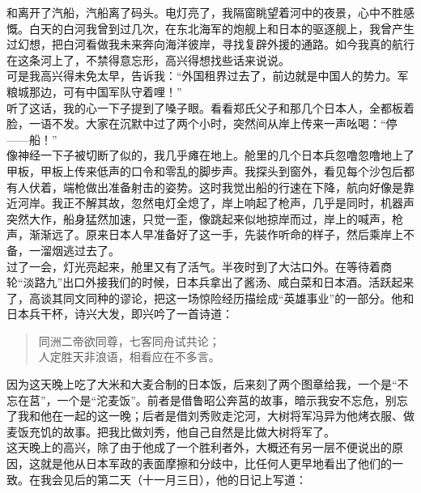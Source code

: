 和离开了汽船，汽船离了码头。电灯亮了，我隔窗眺望着河中的夜景，心中不胜感慨。白天的白河我曾到过几次，在东北海军的炮舰上和日本的驱逐舰上，我曾产生过幻想，把白河看做我未来奔向海洋彼岸，寻找复辟外援的通路。如今我真的航行在这条河上了，不禁得意忘形，高兴得想找些话来说说。\\

可是我高兴得未免太早，告诉我：“外国租界过去了，前边就是中国人的势力。军粮城那边，可有中国军队守着哩！”\\

听了这话，我的心一下子提到了嗓子眼。看看郑氏父子和那几个日本人，全都板着脸，一语不发。大家在沉默中过了两个小时，突然间从岸上传来一声吆喝：“停——船！”\\

像神经一下子被切断了似的，我几乎瘫在地上。舱里的几个日本兵忽噜忽噜地上了甲板，甲板上传来低声的口令和零乱的脚步声。我探头到窗外，看见每个沙包后都有人伏着，端枪做出准备射击的姿势。这时我觉出船的行速在下降，航向好像是靠近河岸。我正不解其故，忽然电灯全熄了，岸上响起了枪声，几乎是同时，机器声突然大作，船身猛然加速，只觉一歪，像跳起来似地掠岸而过，岸上的喊声，枪声，渐渐远了。原来日本人早准备好了这一手，先装作听命的样子，然后乘岸上不备，一溜烟逃过去了。\\

过了一会，灯光亮起来，舱里又有了活气。半夜时到了大沽口外。在等待着商轮“淡路九”出口外接我们的时候，日本兵拿出了酱汤、咸白菜和日本酒。活跃起来了，高谈其同文同种的谬论，把这一场惊险经历描绘成“英雄事业”的一部分。他和日本兵干杯，诗兴大发，即兴吟了一首诗道：\\

\begin{quote}
	同洲二帝欲同尊，七客同舟试共论；\\

人定胜天非浪语，相看应在不多言。\\
\end{quote}

因为这天晚上吃了大米和大麦合制的日本饭，后来刻了两个图章给我，一个是“不忘在莒”，一个是“沱麦饭”。前者是借鲁昭公奔莒的故事，暗示我安不忘危，别忘了我和他在一起的这一晚；后者是借刘秀败走沱河，大树将军冯异为他烤衣服、做麦饭充饥的故事。把我比做刘秀，他自己自然是比做大树将军了。\\

这天晚上的高兴，除了由于他成了一个胜利者外，大概还有另一层不便说出的原因，这就是他从日本军政的表面摩擦和分歧中，比任何人更早地看出了他们的一致。在我会见后的第二天（十一月三日），他的日记上写道：\\

